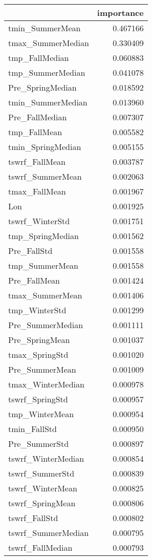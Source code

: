 \begin{tabular}{lr}
\toprule
 & importance \\
\midrule
tmin_SummerMean & 0.467166 \\
tmax_SummerMedian & 0.330409 \\
tmp_FallMedian & 0.060883 \\
tmp_SummerMedian & 0.041078 \\
Pre_SpringMedian & 0.018592 \\
tmin_SummerMedian & 0.013960 \\
Pre_FallMedian & 0.007307 \\
tmp_FallMean & 0.005582 \\
tmin_SpringMedian & 0.005155 \\
tswrf_FallMean & 0.003787 \\
tswrf_SummerMean & 0.002063 \\
tmax_FallMean & 0.001967 \\
Lon & 0.001925 \\
tswrf_WinterStd & 0.001751 \\
tmp_SpringMedian & 0.001562 \\
Pre_FallStd & 0.001558 \\
tmp_SummerMean & 0.001558 \\
Pre_FallMean & 0.001424 \\
tmax_SummerMean & 0.001406 \\
tmp_WinterStd & 0.001299 \\
Pre_SummerMedian & 0.001111 \\
Pre_SpringMean & 0.001037 \\
tmax_SpringStd & 0.001020 \\
Pre_SummerMean & 0.001009 \\
tmax_WinterMedian & 0.000978 \\
tswrf_SpringStd & 0.000957 \\
tmp_WinterMean & 0.000954 \\
tmin_FallStd & 0.000950 \\
Pre_SummerStd & 0.000897 \\
tswrf_WinterMedian & 0.000854 \\
tswrf_SummerStd & 0.000839 \\
tswrf_WinterMean & 0.000825 \\
tswrf_SpringMean & 0.000806 \\
tswrf_FallStd & 0.000802 \\
tswrf_SummerMedian & 0.000795 \\
tswrf_FallMedian & 0.000793 \\

\end{tabular}
